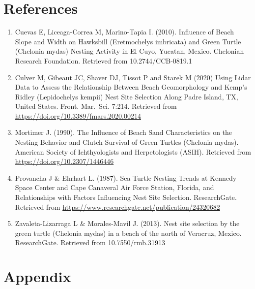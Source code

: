 \documentclass[
]{article}
\begin{document}
\hypertarget{references}{%
\section*{References}\label{references}}

\begin{enumerate}
\def\labelenumi{\arabic{enumi}.}
\item
  Cuevas E, Liceaga-Correa M, Marino-Tapia I. (2010). Influence of Beach Slope and Width on Hawksbill (Eretmochelys imbricata) and Green Turtle (Chelonia mydas) Nesting Activity in El Cuyo, Yucatan, Mexico. Chelonian Research Foundation. Retrieved from 10.2744/CCB-0819.1
\item
  Culver M, Gibeaut JC, Shaver DJ, Tissot P and Starek M (2020) Using Lidar Data to Assess the Relationship Between Beach Geomorphology and Kemp's Ridley (Lepidochelys kempii) Nest Site Selection Along Padre Island, TX, United States. Front. Mar.~Sci. 7:214. Retrieved from \url{https://doi.org/10.3389/fmars.2020.00214}
\item
  Mortimer J. (1990). The Influence of Beach Sand Characteristics on the Nesting Behavior and Clutch Survival of Green Turtles (Chelonia mydas). American Society of Ichthyologists and Herpetologists (ASIH). Retrieved from \url{https://doi.org/10.2307/1446446}
\item
  Provancha J \& Ehrhart L. (1987). Sea Turtle Nesting Trends at Kennedy Space Center and Cape Canaveral Air Force Station, Florida, and Relationships with Factors Influencing Nest Site Selection. ResearchGate. Retrieved from \url{https://www.researchgate.net/publication/24320682}
\item
  Zavaleta-Lizarraga L \& Morales-Mavil J. (2013). Nest site selection by the green turtle (Chelonia mydas) in a beach of the north of Veracruz, Mexico. ResearchGate. Retrieved from 10.7550/rmb.31913
\end{enumerate}

\hypertarget{appendix}{%
\section*{Appendix}\label{appendix}}
\end{document}
